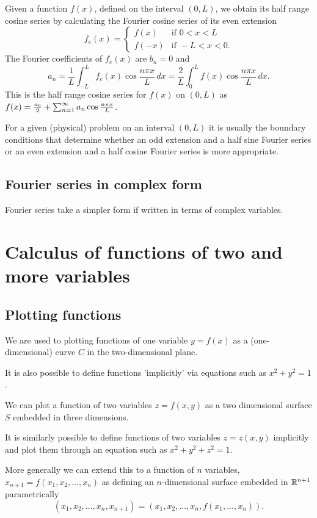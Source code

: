 \documentclass[10pt, a4paper]{article}
\begin{document}
Given a function $f(x)$,
defined on the interval $(0, L)$,
we obtain its half range cosine series by calculating the Fourier cosine series of its even extension
\[
f_e(x) = \begin{cases}
    f(x) & \text{if } 0 < x < L \\
    f(-x) & \text{if } -L < x < 0.
\end{cases}
\]
The Fourier coefficients of $f_e(x)$ are $b_n = 0$ and
\[
a_n = \frac{1}{L}\int_{-L}^{L}f_e(x)\cos{\frac{n\pi x}{L}}\,dx = \frac{2}{L}\int_{0}^{L}f(x)\cos{\frac{n\pi x}{L}}\,dx.
\]
This is the half range cosine series for $f(x)$ on $(0, L)$ as $f(x) = \frac{a_0}{2} + \infsum[n = 1]a_n\cos{\frac{n\pi x}{L}}$.

For a given
(physical)
problem on an interval $(0, L)$ it is usually the boundary conditions that determine whether an odd extension and a half sine Fourier series or an even extension and a half cosine Fourier series is more appropriate.

\subsection{Fourier series in complex form}
Fourier series take a simpler form if written in terms of complex variables.

\newpage

\section{Calculus of functions of two and more variables}

\subsection{Plotting functions}

We are used to plotting functions of one variable $y = f(x)$ as a
(one-dimensional)
curve $C$ in the two-dimensional plane.

It is also possible to define functions 'implicitly' via equations such as $x ^ 2 + y ^ 2 = 1$.

We can plot a function of two variables $z = f(x, y)$ as a two dimensional surface $S$ embedded in three dimensions.

It is similarly possible to define functions of two variables $z = z(x, y)$ implicitly and plot them through an equation such as $x ^ 2 + y ^ 2 + z ^ 2 = 1$.

More generally we can extend this to a function of $n$ variables,
$x_{n + 1} = f(x_1, x_2, \dotsc, x_n)$ as defining an $n$-dimensional surface embedded in $\R ^ {n + 1}$ parametrically
\[
(x_1, x_2, \dotsc, x_n, x_{n + 1}) = (x_1, x_2, \dotsc, x_n, f(x_1, \dotsc, x_n)).
\]
\end{document}
